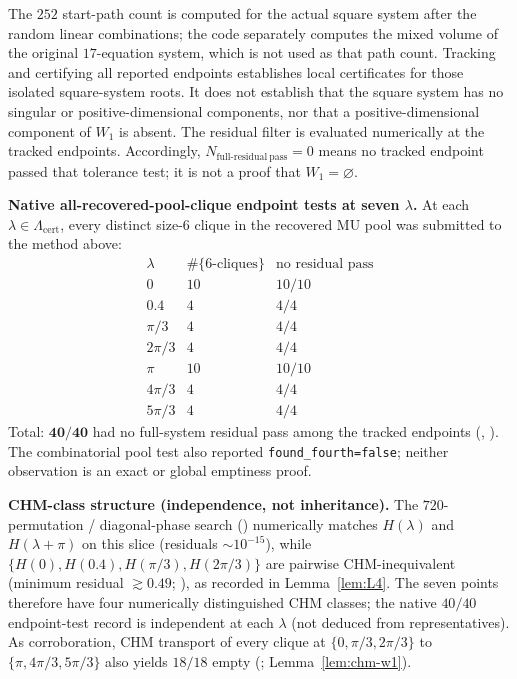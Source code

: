 The $252$ start-path count is computed for the actual square system after the random linear combinations; the code separately computes the mixed volume of the original $17$-equation system, which is not used as that path count. Tracking and certifying all reported endpoints establishes local certificates for those isolated square-system roots. It does not establish that the square system has no singular or positive-dimensional components, nor that a positive-dimensional component of $W_1$ is absent. The residual filter is evaluated numerically at the tracked endpoints. Accordingly, $N_{\mathrm{full\text{-}residual\ pass}}=0$ means no tracked endpoint passed that tolerance test; it is not a proof that $W_1=\varnothing$.

\textbf{Native all-recovered-pool-clique endpoint tests at seven $\lambda$.}
At each $\lambda\in\Lambda_{\mathrm{cert}}$, every distinct size-$6$ clique in the recovered MU pool was submitted to the method above:
\[
\begin{array}{c|cc}
\lambda & \#\{6\text{-cliques}\} & \text{no residual pass}\\
\hline
0 & 10 & 10/10\\
0.4 & 4 & 4/4\\
\pi/3 & 4 & 4/4\\
2\pi/3 & 4 & 4/4\\
\pi & 10 & 10/10\\
4\pi/3 & 4 & 4/4\\
5\pi/3 & 4 & 4/4
\end{array}
\]
Total: $\mathbf{40/40}$ had no full-system residual pass among the tracked endpoints (, ). The combinatorial pool test also reported \texttt{found\_fourth=false}; neither observation is an exact or global emptiness proof.

\textbf{CHM-class structure (independence, not inheritance).}
The $720$-permutation / diagonal-phase search () numerically matches $H(\lambda)$ and $H(\lambda+\pi)$ on this slice (residuals $\sim10^{-15}$), while
$\{H(0),H(0.4),H(\pi/3),H(2\pi/3)\}$ are pairwise CHM-inequivalent (minimum residual $\gtrsim0.49$; ), as recorded in Lemma~\ref{lem:L4}.
The seven points therefore have four numerically distinguished CHM classes; the native $40/40$ endpoint-test record is independent at each $\lambda$ (not deduced from representatives).
As corroboration, CHM transport of every clique at $\{0,\pi/3,2\pi/3\}$ to $\{\pi,4\pi/3,5\pi/3\}$ also yields $18/18$ empty (; Lemma~\ref{lem:chm-w1}).

